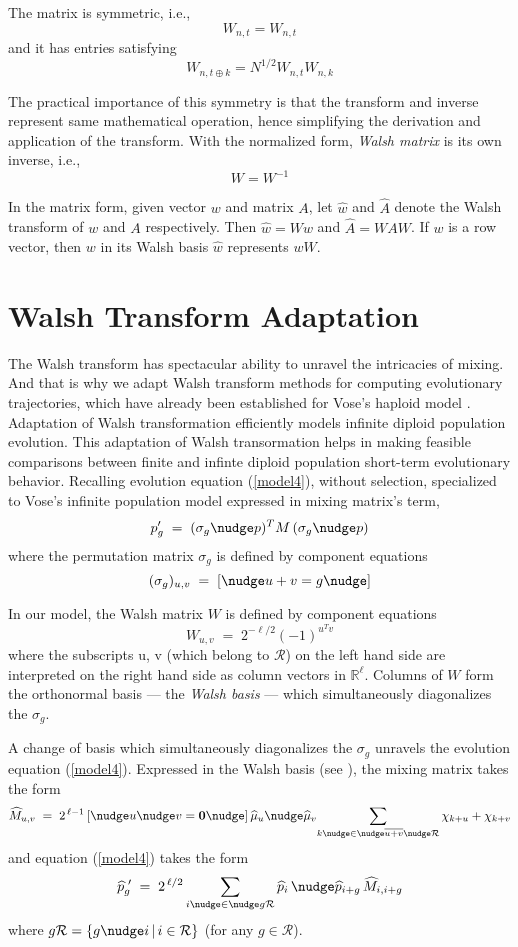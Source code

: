 The matrix is symmetric, i.e.,
\[
W_{n,t} = W_{n,t}
\]
and it has entries satisfying
\[
W_{n, t \oplus k} = N^{1/2} W_{n, t} W_{n, k}
\]

The practical importance of this symmetry is that the transform and inverse represent same mathematical operation, hence simplifying the derivation and application of the transform. With the normalized form, \textit{Walsh matrix} is its own inverse, i.e.,
\[
W = W^{-1}
\]

In the matrix form, given vector $w$ and matrix $A$, let $\widehat{w}$ and
$\widehat{A}$ denote the Walsh transform of $w$ and $A$ respectively. Then $\widehat{w} = Ww$ and
$\widehat{A} = WAW$. If $w$ is a row vector, then $w$ in its Walsh basis $\widehat{w}$ represents $wW$.

\section{Walsh Transform Adaptation}
The Walsh transform has spectacular ability to unravel the intricacies of mixing. And that is why we adapt Walsh transform methods for computing evolutionary trajectories, which have already been established for Vose's haploid model \cite{Vose1999}. Adaptation of Walsh transformation efficiently models infinite diploid population evolution. This adaptation of Walsh transormation helps in making feasible comparisons between finite and infinte diploid population short-term evolutionary behavior.
Recalling evolution equation (\ref{model4}), without selection, specialized to Vose's infinite population model expressed in mixing matrix's term,
\[
p_g^\prime \; = \; (\sigma_g \nudge p)^T M \, (\sigma_g \nudge p)
\]
where the permutation matrix $\sigma_g$ is defined by component
equations
\[
(\sigma_g)_{u,v} \; = \; [\nudge u+v = g\nudge ]
\]

In our model, the Walsh matrix $W$
is defined by component equations
\[
W_{u,v} \; = \; 2^{-\ell/2} (-1)^{u^T v}
\]
where the subscripts \nudge u, \nudge v (which belong to $\mathcal{R}$) on the left hand side are interpreted on the right hand side as column vectors in $\mathbb{R}^{\ell}$.
Columns of $W$ form the orthonormal basis --- the
{\em Walsh basis\/} --- which simultaneously diagonalizes the
$\sigma_g$.

A change of basis which simultaneously diagonalizes the $\sigma_g$
unravels the evolution equation (\ref{model4}).  
Expressed in the Walsh basis (see \cite{Vose1999}), the mixing matrix
takes the form
\begin{equation}
\label{Mhat}
\widehat{M}_{u,v} \; = \; 2^{\,\ell-1} \,[\nudge u \nudge v = {\bf
    0}\nudge]\, \widehat{\mu}_u \nudge \widehat{\mu}_v \!  \sum_{k
  \nudge \in \nudge \overline{u+v} \nudge \mathcal{R}} \chi_{k + u} +
\chi_{k + v}
\end{equation}
and equation (\ref{model4}) takes the form
\begin{equation}
\label{model5}
\widehat{p}_g^{\,\,\prime} \; = \; 2^{\,\ell/2} \sum_{i \nudge \in \nudge g \mathcal{R}}
\widehat{p}_i \, \nudge \widehat{p}_{i+g} \,\widehat{M}_{i,i+g}
\end{equation}
where $g \mathcal{R} = \{g \nudge i \, | \, i \in \mathcal{R} \}$ (for
any $g \in \mathcal{R}$).

